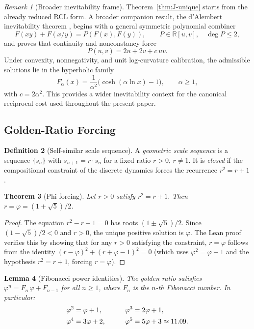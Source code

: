 \documentclass[12pt]{article}
\newtheorem{theorem}{Theorem}[section]
\newtheorem{lemma}[theorem]{Lemma}
\theoremstyle{definition}
\newtheorem{definition}[theorem]{Definition}
\theoremstyle{remark}
\newtheorem{remark}[theorem]{Remark}
\begin{document}
\begin{remark}[Broader inevitability frame]
Theorem~\ref{thm:J-unique} starts from the already reduced RCL form.
A broader companion result, the d'Alembert inevitability theorem
\cite{WashburnZlatanovicAllahyarov2026Inevitability}, begins with a
general symmetric polynomial combiner
\[
F(xy)+F(x/y)=P(F(x),F(y)),
\qquad P\in \mathbb{R}[u,v],\quad \deg P \le 2,
\]
and proves that continuity and nonconstancy force
\[
P(u,v)=2u+2v+c\,uv.
\]
Under convexity, nonnegativity, and unit log-curvature calibration, the
admissible solutions lie in the hyperbolic family
\[
F_\alpha(x)=\frac{1}{\alpha^2}\big(\cosh(\alpha\ln x)-1\big),
\qquad \alpha \ge 1,
\]
with $c=2\alpha^2$. This provides a wider inevitability context for the
canonical reciprocal cost used throughout the present paper.
\end{remark}

\subsection{Golden-Ratio Forcing}
\label{sec:phi}

\begin{definition}[Self-similar scale sequence]
A \emph{geometric scale sequence} is a sequence $\{s_n\}$ with
$s_{n+1} = r \cdot s_n$ for a fixed ratio $r > 0$, $r \neq 1$. It
is \emph{closed} if the compositional constraint of the discrete
dynamics forces the recurrence $r^2 = r + 1$.
\end{definition}

\begin{theorem}[Phi forcing]
\label{thm:phi}
Let $r > 0$ satisfy $r^2 = r + 1$. Then $r = \varphi = (1+\sqrt{5})/2$.
\end{theorem}

\begin{proof}
The equation $r^2 - r - 1 = 0$ has roots $(1 \pm \sqrt{5})/2$. Since
$(1 - \sqrt{5})/2 < 0$ and $r > 0$, the unique positive solution is
$\varphi$. The Lean proof verifies this by showing that for any
$r > 0$ satisfying the constraint, $r = \varphi$ follows from the
identity $(r - \varphi)^2 + (r + \varphi - 1)^2 = 0$ (which uses
$\varphi^2 = \varphi + 1$ and the hypothesis $r^2 = r + 1$, forcing
$r = \varphi$).
\end{proof}

\begin{lemma}[Fibonacci power identities]
\label{lem:fib}
The golden ratio satisfies $\varphi^n = F_n\,\varphi + F_{n-1}$
for all $n \geq 1$, where $F_n$ is the $n$-th Fibonacci number. In
particular:
\begin{alignat}{2}
  \varphi^2 &= \varphi + 1, \qquad&
  \varphi^3 &= 2\varphi + 1,
  \notag\\
  \varphi^4 &= 3\varphi + 2, \qquad&
  \varphi^5 &= 5\varphi + 3 \approx 11.09.
  \label{eq:fib-powers}
\end{alignat}
\end{lemma}
\end{document}
